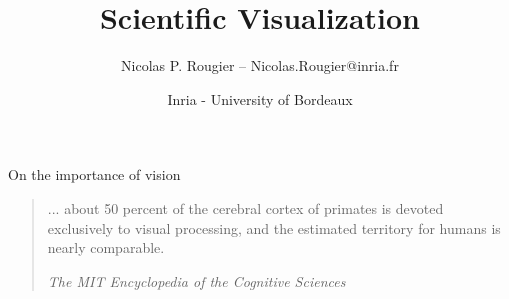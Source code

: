 \documentclass[10pt,aspectratio=169]{beamer}
\title{Scientific Visualization}
\date{Inria - University of Bordeaux}
\author{Nicolas P. Rougier -- Nicolas.Rougier@inria.fr}
\institute{ASPP - August 2021}
\begin{document}
\maketitle


\begin{frame}{On the importance of vision}

  \begin{quote}
    ... about 50 percent of the cerebral cortex of primates is devoted
    exclusively to visual processing, and the estimated territory for humans is
    nearly comparable.
    \begin{flushright}
      \em \small The MIT Encyclopedia of the Cognitive Sciences
    \end{flushright}
  \end{quote}
\end{frame}
\end{document}

